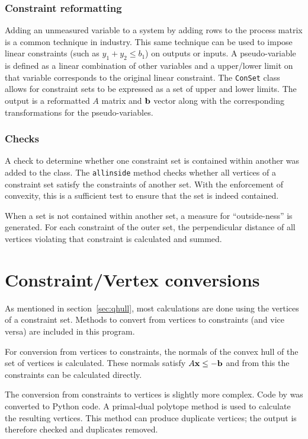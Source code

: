 \subsubsection{Constraint reformatting}
Adding an unmeasured variable to a system by adding rows to the process matrix is a common technique in industry.
This same technique can be used to impose linear constraints (such as $y_1+y_2\leq b_1$) on outputs or inputs.
A pseudo-variable is defined as a linear combination of other variables and a upper/lower limit on that variable corresponds to the original linear constraint.
The \texttt{ConSet} class allows for constraint sets to be expressed as a set of upper and lower limits.
The output is a reformatted $A$ matrix and ${\bf {b}}$ vector along with the corresponding transformations for the pseudo-variables.

\subsubsection{Checks}
A check to determine whether one constraint set is contained within another was added to the class.
The \texttt{allinside} method checks whether all vertices of a constraint set satisfy the constraints of another set.
With the enforcement of convexity, this is a sufficient test to ensure that the set is indeed contained.

When a set is not contained within another set, a measure for ``outside-ness'' is generated.
For each constraint of the outer set, the perpendicular distance of all vertices violating that constraint is calculated and summed.

\section{Constraint/Vertex conversions}\label{sec:con2vert}
As mentioned in section~\ref{sec:qhull}, most calculations are done using the vertices of a constraint set.
Methods to convert from vertices to constraints (and vice versa) are included in this program.

For conversion from vertices to constraints, the normals of the convex hull of the set of vertices is calculated.
These normals satisfy $A{\bf {x}} \leq -{\bf {b}}$ \citep{qhulldocs} and from this the constraints can be calculated directly.

The conversion from constraints to vertices is slightly more complex.
Code by \citet{con2vert} was converted to Python code.
A primal-dual polytope method is used to calculate the resulting vertices.
This method can produce duplicate vertices; the output is therefore checked and duplicates removed.

